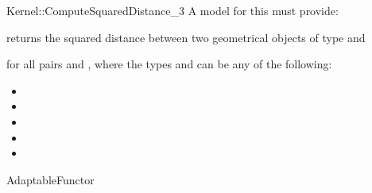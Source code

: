 \begin{ccRefFunctionObjectConcept}{Kernel::ComputeSquaredDistance_3}
A model for this must provide:


{returns the squared distance between two geometrical objects of type
 and  }

for all pairs  and , where
the types  and  can be any of the
following:
\begin{itemize}
\item {}
\item {}
\item {}
\item {}
\item {}
\end{itemize}

\ccRefines
AdaptableFunctor

\ccSeeAlso
{}  \\

\end{ccRefFunctionObjectConcept}
